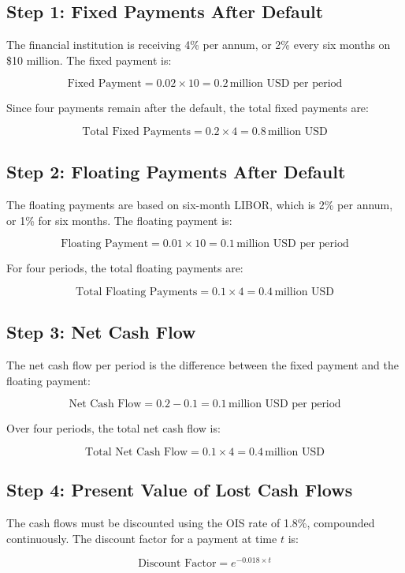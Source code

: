 \documentclass[12pt,letterpaper, onecolumn]{exam}
\begin{document}
\begin{questions}
    \begin{solution}
    \subsection*{Step 1: Fixed Payments After Default}
The financial institution is receiving 4\% per annum, or 2\% every six months on \$10 million. The fixed payment is:

\[
\text{Fixed Payment} = 0.02 \times 10 = 0.2 \, \text{million USD per period}
\]

Since four payments remain after the default, the total fixed payments are:

\[
\text{Total Fixed Payments} = 0.2 \times 4 = 0.8 \, \text{million USD}
\]

\subsection*{Step 2: Floating Payments After Default}
The floating payments are based on six-month LIBOR, which is 2\% per annum, or 1\% for six months. The floating payment is:

\[
\text{Floating Payment} = 0.01 \times 10 = 0.1 \, \text{million USD per period}
\]

For four periods, the total floating payments are:

\[
\text{Total Floating Payments} = 0.1 \times 4 = 0.4 \, \text{million USD}
\]

\subsection*{Step 3: Net Cash Flow}
The net cash flow per period is the difference between the fixed payment and the floating payment:

\[
\text{Net Cash Flow} = 0.2 - 0.1 = 0.1 \, \text{million USD per period}
\]

Over four periods, the total net cash flow is:

\[
\text{Total Net Cash Flow} = 0.1 \times 4 = 0.4 \, \text{million USD}
\]

\subsection*{Step 4: Present Value of Lost Cash Flows}
The cash flows must be discounted using the OIS rate of 1.8\%, compounded continuously. The discount factor for a payment at time \(t\) is:

\[
\text{Discount Factor} = e^{-0.018 \times t}
\]


\end{solution}
\end{questions}
\end{document}
